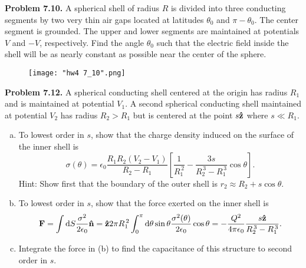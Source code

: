 \documentclass{article}
\begin{document}
\vfill
\noindent\begin{minipage}{\textwidth}
\hrulefill

\textbf{Problem 7.10.} A spherical shell of radius $R$ is divided into three conducting segments by two very thin air gaps located at latitudes $\theta_0$ and $\pi - \theta_0$. The center segment is grounded. The upper and lower segments are maintained at potentials $V$ and $-V$, respectively. Find the angle $\theta_0$ such that the electric field inside the shell will be as nearly constant as possible near the center of the sphere.

\begin{figure}[H]
\centering
\texttt{[image: "hw4 7\_10".png]}
\end{figure}

\end{minipage}
\vfill
\noindent\begin{minipage}{\textwidth}
\hrulefill

\textbf{Problem 7.12.} A spherical conducting shell centered at the origin has radius $R_1$ and is maintained at potential $V_1$. A second spherical conducting shell maintained at potential $V_2$ has radius $R_2 > R_1$ but is centered at the point $s\vu{z}$ where $s \ll R_1$.
\begin{enumerate}[(a)]
    \item To lowest order in $s$, show that the charge density induced on the surface of the inner shell is
    \[
        \sigma(\theta) = \epsilon_0 \frac{R_1R_2(V_2-V_1)}{R_2-R_1}\left[\frac{1}{R_1^{\,2}}-\frac{3s}{R_2^{\,3}-R_1^{\,3}}\cos\theta\right].
    \]
    Hint: Show first that the boundary of the outer shell is $r_2 \approx R_2+s\cos\theta$.

    \item To lowest order in $s$, show that the force exerted on the inner shell is
    \[
        \vb{F} = \int\dd S \frac{\sigma^2}{2\epsilon_0}\vu{n} = \vu{z} 2\pi R_1^{\,2}\int_0^\pi \dd\theta\sin\theta \frac{\sigma^2(\theta)}{2\epsilon_0}\cos\theta = - \frac{Q^2}{4\pi\epsilon_0}\frac{s\vu{z}}{R_2^{\,3}-R_1^{\,3}}.
    \]

    \item Integrate the force in (b) to find the capacitance of this structure to second order in $s$.
\end{enumerate}

\end{minipage}
\end{document}
